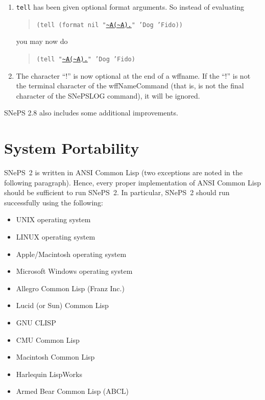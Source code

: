 \documentclass{book}
\begin{document}
\begin{description}
\begin{description}
\begin{enumerate}
\item \texttt{tell} has been given optional format arguments.  So instead
     of evaluating
     \begin{quote}
     \texttt{(tell (format nil "\url{~A(~A).}" 'Dog 'Fido))}
     \end{quote}
     you may now do
     \begin{quote}
     \texttt{(tell "\url{~A(~A).}" 'Dog 'Fido)}
     \end{quote}

   \item The character ``!'' is now optional at the end of a wffname.  If the
     ``!''  is not the terminal character of the wffNameCommand (that is, is not
     the final character of the SNePSLOG command), it will be ignored.
    \end{enumerate}
  \end{description}
SNePS 2.8 also includes some additional improvements.
\end{description}


\section{System Portability}
SNePS~2 is written in ANSI {\sc Common Lisp} (two exceptions are noted
in the following paragraph). Hence, every proper implementation of
ANSI {\sc Common Lisp} should be sufficient to run SNePS~2.  In
particular, SNePS~2 should run successfully using the following:
\begin{itemize}
\item UNIX operating system
\item LINUX operating system
\item Apple/Macintosh operating system
\item Microsoft Windows operating system
\item Allegro Common Lisp (Franz Inc.)
\item Lucid (or Sun) Common Lisp
\item GNU CLISP
\item CMU Common Lisp
\item Macintosh Common Lisp
\item Harlequin LispWorks
\item Armed Bear Common Lisp (ABCL)
\end{itemize}
\end{document}
